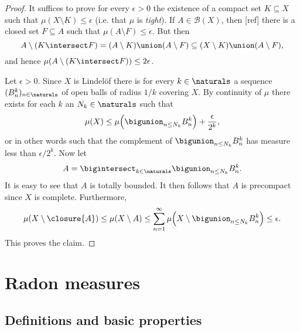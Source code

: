 \documentclass[article, a4paper, 11pt, oneside]{memoir}
\numberwithin{equation}{chapter}
\newcommand{\calB}{\mathcal{B}}
\newcommand{\borel}[1]{\calB(#1)}
\begin{document}
\begin{proof}
    It suffices to prove for every $\epsilon > 0$ the existence of a compact set $K \subseteq X$ such that $\mu(X \setminus K) \leq \epsilon$ (i.e. that $\mu$ is \emph{tight}). If $A \in \borel{X}$, then [ref] there is a closed set $F \subseteq A$ such that $\mu(A \setminus F) \leq \epsilon$. But then
    \begin{equation*}
        A \setminus (K \intersect F)
            = (A \setminus K) \union (A \setminus F)
            \subseteq (X \setminus K) \union (A \setminus F),
    \end{equation*}
    and hence $\mu(A \setminus (K \intersect F)) \leq 2\epsilon$.

    Let $\epsilon > 0$. Since $X$ is Lindelöf there is for every $k \in \naturals$ a sequence $(B_n^k)_{n \in \naturals}$ of open balls of radius $1/k$ covering $X$. By continuity of $\mu$ there exists for each $k$ an $N_k \in \naturals$ such that
    \begin{equation*}
        \mu(X)
            \leq \mu \Bigl( \bigunion_{n \leq N_k} B_n^k \Bigr) + \frac{\epsilon}{2^k},
    \end{equation*}
    or in other words such that the complement of $\bigunion_{n \leq N_k} B_n^k$ has measure less than $\epsilon/2^k$. Now let
    \begin{equation*}
        A
            = \bigintersect_{k \in \naturals}
              \bigunion_{n \leq N_k} B_n^k.
    \end{equation*}
    It is easy to see that $A$ is totally bounded. It then follows that $A$ is precompact since $X$ is complete. Furthermore,
    \begin{equation*}
        \mu(X \setminus \closure{A})
            \leq \mu(X \setminus A)
            \leq \sum_{n=1}^\infty \mu \Bigl( X \setminus \bigunion_{n \leq N_k} B_n^k \Bigr)
            \leq \epsilon.
    \end{equation*}
    This proves the claim.
\end{proof}


\chapter{Radon measures}

\section{Definitions and basic properties}
\end{document}
